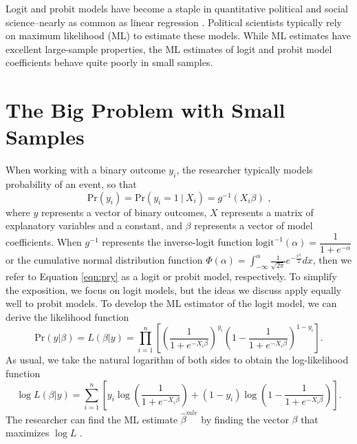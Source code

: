 \documentclass[12pt]{article}
\begin{document}
\thispagestyle{empty}

\newpage
\onehalfspace

Logit and probit models have become a staple in quantitative political and social science--nearly as common as linear regression \citep{KruegerLewisBeck2008}. 
Political scientists typically rely on maximum likelihood (ML) to estimate these models.
While ML estimates have excellent large-sample properties, the ML estimates of logit and probit model coefficients behave quite poorly in small samples.

\section*{The Big Problem with Small Samples}

When working with a binary outcome $y_i$, the researcher typically models probability of an event, so that
\begin{equation}\label{eqn:pry}
\text{Pr}(y_i) = \text{Pr}(y_i = 1~|~ X_i) =  g^{-1}(X_i\beta)\text{ ,}
\end{equation}
where $y$ represents a vector of binary outcomes, $X$ represents a matrix of explanatory variables and a constant, and $\beta$ represents a vector of model coefficients. 
When $g^{-1}$ represents the inverse-logit function $\text{logit}^{-1}(\alpha) = \dfrac{1}{1 + e^{-\alpha}}$ or the cumulative normal distribution function $\Phi(\alpha) = \int_{-\infty}^\alpha \frac{1}{\sqrt{2\pi}}e^{-\frac{x^2}{2}}dx$, then we refer to Equation \ref{eqn:pry} as a logit or probit model, respectively.
To simplify the exposition, we focus on logit models, but the ideas we discuss apply equally well to probit models.
To develop the ML estimator of the logit model, we can derive the likelihood function
\begin{equation}\nonumber
\text{Pr}(y | \beta) = L(\beta | y) = \displaystyle \prod_{i = 1}^n \left[\left( \dfrac{1}{1 + e^{-X_i\beta}}\right)^{y_i}\left(1- \dfrac{1}{1 + e^{-X_i\beta}}\right)^{1 - y_i}\right]\text{.}
\end{equation}
\noindent As usual, we take the natural logarithm of both sides to obtain the log-likelihood function
\begin{equation}\nonumber
\log L(\beta | y) = \displaystyle \sum_{i = 1}^n \left[y_i \log \left( \dfrac{1}{1 + e^{-X_i\beta}}\right) + (1 - y_i) \log \left(1- \dfrac{1}{1 + e^{-X_i\beta}}\right)\right].
\end{equation}
\noindent The researcher can find the ML estimate $\hat{\beta}^{mle}$ by finding the vector $\beta$ that maximizes $\log L$ \citep{King1989}.
\end{document}
